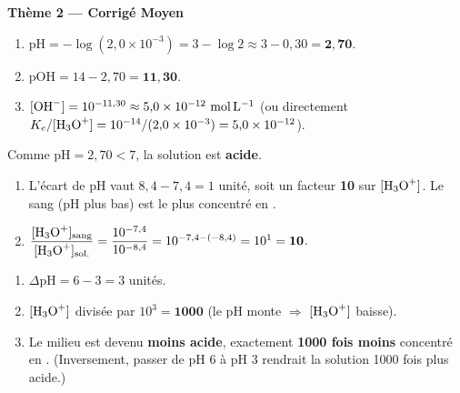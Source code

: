 \documentclass[11pt,a4paper]{article}
\begin{document}
\begin{center}
{\LARGE\bfseries\color{primarydark} Thème 2 --- Corrigé Moyen}
\end{center}

\begin{corrbox}
\begin{enumerate}[label=\alph*),leftmargin=1.6em,itemsep=1pt]
  \item $\mathrm{pH} = -\log(2{,}0\times10^{-3}) = 3 - \log 2 \approx 3 - 0{,}30 = \mathbf{2{,}70}$.
  \item $\mathrm{pOH} = 14 - 2{,}70 = \mathbf{11{,}30}$.
  \item $[\ce{OH-}] = 10^{-11{,}30} \approx 5{,}0\times10^{-12}\ \si{mol.L^{-1}}$ (ou directement
        $K_e/[\ce{H3O+}] = 10^{-14}/(2{,}0\times10^{-3}) = 5{,}0\times10^{-12}$).
\end{enumerate}
Comme $\mathrm{pH}=2{,}70<7$, la solution est \textcolor{acidecol}{\textbf{acide}}.
\end{corrbox}

\begin{corrbox}
\begin{enumerate}[label=\alph*),leftmargin=1.6em,itemsep=2pt]
  \item L'écart de pH vaut $8{,}4-7{,}4 = 1$ unité, soit un facteur \textbf{10} sur $[\ce{H3O+}]$. Le sang
        (pH plus bas) est le plus concentré en .
  \item $\dfrac{[\ce{H3O+}]_{\text{sang}}}{[\ce{H3O+}]_{\text{sol.}}}
        = \dfrac{10^{-7{,}4}}{10^{-8{,}4}} = 10^{-7{,}4-(-8{,}4)} = 10^{1} = \mathbf{10}$.
\end{enumerate}
\end{corrbox}

\begin{corrbox}
\begin{enumerate}[label=\alph*),leftmargin=1.6em,itemsep=1pt]
  \item $\Delta\mathrm{pH} = 6 - 3 = 3$ unités.
  \item $[\ce{H3O+}]$ divisée par $10^{3} = \mathbf{1000}$ (le pH monte $\Rightarrow$ $[\ce{H3O+}]$ baisse).
  \item Le milieu est devenu \textbf{moins acide}, exactement \textbf{1000 fois moins} concentré en .
        (Inversement, passer de pH 6 à pH 3 rendrait la solution 1000 fois plus acide.)
\end{enumerate}
\end{corrbox}
\end{document}
